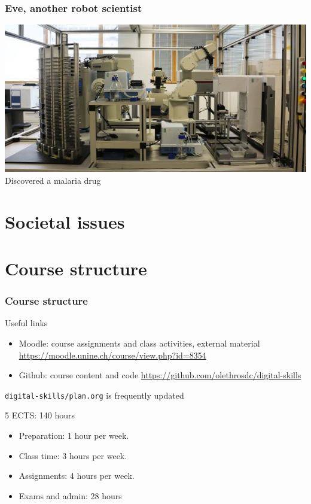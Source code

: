 \documentclass{beamer}
\begin{document}
\begin{frame}
  \frametitle{Eve, another robot scientist}
  \includegraphics[width=\textwidth]{figures/eve.jpg}
  Discovered a malaria drug
\end{frame}

\section{Societal issues}


\section{Course structure}

\begin{frame}
  \frametitle{Course structure}
  \begin{block}{Useful links}
    \begin{itemize}
    \item Moodle: course assignments and class activities, external material
      \url{https://moodle.unine.ch/course/view.php?id=8354}
    \item Github: course content and code \url{https://github.com/olethrosdc/digital-skills}
    \end{itemize}
    \texttt{digital-skills/plan.org} is frequently updated
  \end{block}
  \begin{block}{5 ECTS: 140 hours}
    \begin{itemize}
    \item Preparation: 1 hour per week.
    \item Class time: 3 hours per week.
    \item Assignments: 4 hours per week.
    \item Exams and admin: 28 hours
    \end{itemize}
  \end{block}
\end{frame}
\end{document}
